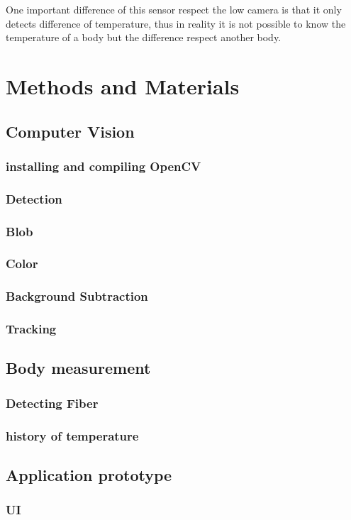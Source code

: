 \documentclass[hidelinks,11pt,a4paper,oneside,article]{memoir}
\begin{document}
    One important difference of this sensor respect the low camera is that it only detects difference of temperature, thus in reality it is not possible to know the temperature of a body but the difference respect another body.
    
    \clearpage
	\chapter{Methods and Materials}
    \section{Computer Vision}
    \subsection{installing and compiling OpenCV}
    \subsection{Detection}
    \subsection{Blob}
    \subsection{Color}
    \subsection{Background Subtraction}
    \subsection{Tracking}
    \section{Body measurement}
    \subsection{Detecting Fiber}
    \subsection{history of temperature}
    \section{Application prototype}
    \subsection{UI}
\end{document}

